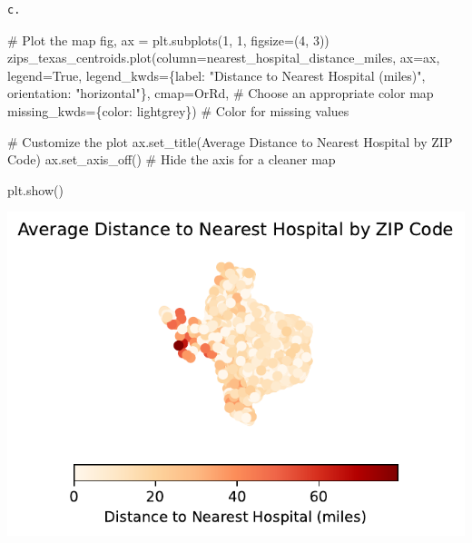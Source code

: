 \documentclass[
  letterpaper,
  DIV=11,
  numbers=noendperiod]{scrartcl}
\newenvironment{Shaded}{\begin{snugshade}}{\end{snugshade}}
\newcommand{\CommentTok}[1]{\textcolor[rgb]{0.37,0.37,0.37}{#1}}
\newcommand{\DecValTok}[1]{\textcolor[rgb]{0.68,0.00,0.00}{#1}}
\newcommand{\NormalTok}[1]{\textcolor[rgb]{0.00,0.23,0.31}{#1}}
\newcommand{\OperatorTok}[1]{\textcolor[rgb]{0.37,0.37,0.37}{#1}}
\newcommand{\StringTok}[1]{\textcolor[rgb]{0.13,0.47,0.30}{#1}}
\newcommand{\VariableTok}[1]{\textcolor[rgb]{0.07,0.07,0.07}{#1}}
\begin{document}
\begin{verbatim}
c.
\end{verbatim}

\begin{Shaded}
\begin{Highlighting}[]
\CommentTok{\# Plot the map}
\NormalTok{fig, ax }\OperatorTok{=}\NormalTok{ plt.subplots(}\DecValTok{1}\NormalTok{, }\DecValTok{1}\NormalTok{, figsize}\OperatorTok{=}\NormalTok{(}\DecValTok{4}\NormalTok{, }\DecValTok{3}\NormalTok{))}
\NormalTok{zips\_texas\_centroids.plot(column}\OperatorTok{=}\StringTok{\textquotesingle{}nearest\_hospital\_distance\_miles\textquotesingle{}}\NormalTok{, }
\NormalTok{                          ax}\OperatorTok{=}\NormalTok{ax, }
\NormalTok{                          legend}\OperatorTok{=}\VariableTok{True}\NormalTok{, }
\NormalTok{                          legend\_kwds}\OperatorTok{=}\NormalTok{\{}\StringTok{\textquotesingle{}label\textquotesingle{}}\NormalTok{: }\StringTok{"Distance to Nearest Hospital (miles)"}\NormalTok{, }\StringTok{\textquotesingle{}orientation\textquotesingle{}}\NormalTok{: }\StringTok{"horizontal"}\NormalTok{\},}
\NormalTok{                          cmap}\OperatorTok{=}\StringTok{\textquotesingle{}OrRd\textquotesingle{}}\NormalTok{,  }\CommentTok{\# Choose an appropriate color map}
\NormalTok{                          missing\_kwds}\OperatorTok{=}\NormalTok{\{}\StringTok{\textquotesingle{}color\textquotesingle{}}\NormalTok{: }\StringTok{\textquotesingle{}lightgrey\textquotesingle{}}\NormalTok{\})  }\CommentTok{\# Color for missing values}

\CommentTok{\# Customize the plot}
\NormalTok{ax.set\_title(}\StringTok{\textquotesingle{}Average Distance to Nearest Hospital by ZIP Code\textquotesingle{}}\NormalTok{)}
\NormalTok{ax.set\_axis\_off()  }\CommentTok{\# Hide the axis for a cleaner map}

\NormalTok{plt.show()}
\end{Highlighting}
\end{Shaded}

\includegraphics{Sujie- Abu Bakar_files/figure-pdf/cell-39-output-1.pdf}
\end{document}
